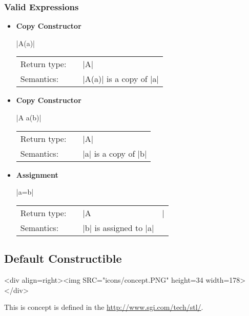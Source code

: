 \documentclass[12pt,twoside]{report}
\begin{document}
\subsubsection*{Valid Expressions}
\begin{itemize}


\item {\bf Copy Constructor}
  
  |A(a)|
  
  \begin{tabular}[!h]{l p{1cm} p{10cm}}
    Return type: & & |A| \\
    Semantics: & & |A(a)| is a copy of |a|\\
  \end{tabular}
   

\item {\bf Copy Constructor}
  
  |A a(b)|
  
  \begin{tabular}[!h]{l p{1cm} p{10cm}}
    Return type: & & |A| \\
    Semantics: & & |a| is a copy of |b|\\
  \end{tabular}

   
\item {\bf Assignment}
  
  |a=b|
  
  \begin{tabular}[!h]{l p{1cm} p{10cm}}
    Return type: & & |A&| \\
    Semantics: & & |b| is assigned to |a|\\
  \end{tabular}
                               
 

\end{itemize}


\subsection{Default Constructible}
\label{concept:default_constructible}
\begin{htmlonly}
<div align=right><img SRC="icons/concept.PNG" height=34 width=178></div>
\end{htmlonly}

This is concept is defined in the \hyperref{STL}{STL (see M. Austern, Generic Programming and the STL, Addison Wesley Longman, 1999) }{}{http://www.sgi.com/tech/stl/}.
\end{document}
